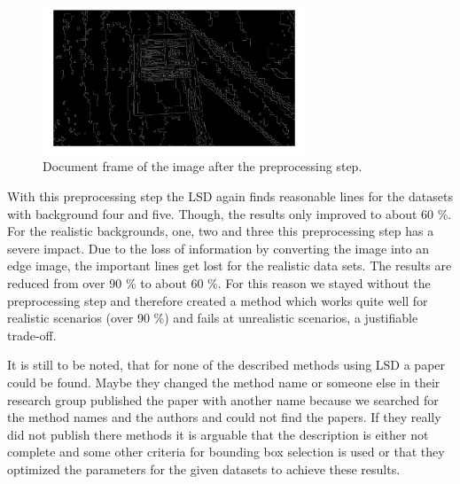 \documentclass[english, paper=a4]{scrartcl}
\begin{document}
\begin{figure}[h]
	\centering
	\includegraphics[width=0.7\textwidth]{pre.png}
	\caption{Document frame of the image after the preprocessing step.}
	\label{fig:pre}
\end{figure}

With this preprocessing step the LSD again finds reasonable lines for the datasets
with background four and five. Though, the results only improved to about 60 \%.
For the realistic backgrounds, one, two and three this preprocessing step has a severe impact. Due to the loss of information by converting the image into an edge image,
the important lines get lost for the realistic data sets.
The results are reduced from over 90 \% to about 60 \%. 
For this reason we stayed without the preprocessing step and 
therefore created a method which works quite well for realistic scenarios
(over 90 \%) and fails at unrealistic scenarios, a justifiable trade-off.

It is still to be noted, that for none of the described methods using LSD
a paper could be found. Maybe they changed the method name or someone else
in their research group published the paper with another name
because we searched for the method names and the authors and could not find the papers.
If they really did not publish there methods it is arguable that 
the description is either not complete and some other
criteria for bounding box selection is used or that they optimized
the parameters for the given datasets to achieve these results.

\newpage


\end{document}
